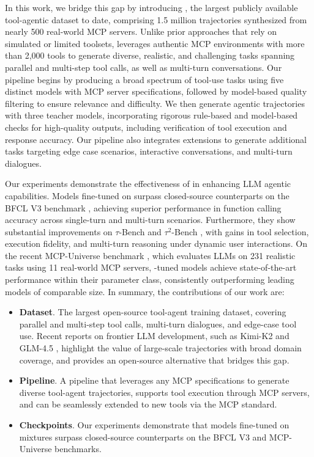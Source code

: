 In this work, we bridge this gap by introducing \datanamen, the largest publicly available tool-agentic dataset to date, comprising 1.5 million trajectories synthesized from nearly 500 real-world MCP servers. Unlike prior approaches that rely on simulated or limited toolsets, \dataname leverages authentic MCP environments with more than 2,000 tools to generate diverse, realistic, and challenging tasks spanning parallel and multi-step tool calls, as well as multi-turn conversations.
Our pipeline begins by producing a broad spectrum of tool-use tasks using five distinct models with MCP server specifications, followed by model-based quality filtering to ensure relevance and difficulty. We then generate agentic trajectories with three teacher models, incorporating rigorous rule-based and model-based checks for high-quality outputs, including verification of tool execution and response accuracy. 
Our pipeline also integrates extensions to generate additional tasks targeting edge case scenarios, interactive conversations, and multi-turn dialogues.

Our experiments demonstrate the effectiveness of \dataname in enhancing LLM agentic capabilities. Models fine-tuned on \dataname surpass closed-source counterparts on the BFCL V3 benchmark \citep{patil2025bfcl}, achieving superior performance in function calling accuracy across single-turn and multi-turn scenarios. Furthermore, they show substantial improvements on $\tau$-Bench \citep{yao2024taubenchbenchmarktoolagentuserinteraction} and $\tau^2$-Bench \citep{barres2025tau2benchevaluatingconversationalagents}, with gains in tool selection, execution fidelity, and multi-turn reasoning under dynamic user interactions. On the recent MCP-Universe benchmark \citep{mcpuniverse}, which evaluates LLMs on 231 realistic tasks using 11 real-world MCP servers, \datanamen-tuned models achieve state-of-the-art performance within their parameter class, consistently outperforming leading models of comparable size.
In summary, the contributions of our work are:

\begin{itemize}[itemsep=0pt, parsep=0pt, topsep=0pt, leftmargin=1em]
  \item \textbf{\dataname Dataset}. The largest open-source tool-agent training dataset, covering parallel and multi-step tool calls, multi-turn dialogues, and edge-case tool use. Recent reports on frontier LLM development, such as Kimi-K2 \citep{kimiteam2025kimik2openagentic} and GLM-4.5 \citep{5team2025glm45agenticreasoningcoding}, highlight the value of large-scale trajectories with broad domain coverage, and \dataname provides an open-source alternative that bridges this gap.
  \item \textbf{\dataname Pipeline}. A pipeline that leverages any MCP specifications to generate diverse tool-agent trajectories, supports tool execution through MCP servers, and can be seamlessly extended to new tools via the MCP standard.
  \item \textbf{\dataname Checkpoints}. Our experiments demonstrate that models fine-tuned on \dataname mixtures surpass closed-source counterparts on the BFCL V3 and MCP-Universe benchmarks.
\end{itemize}

